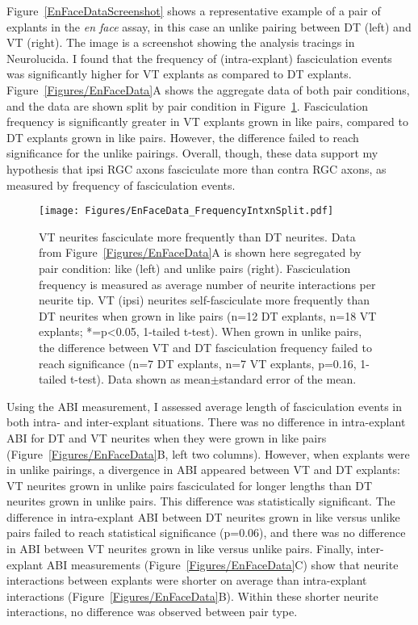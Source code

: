 Figure~\ref{EnFaceDataScreenshot} shows a representative example of a pair of explants in the \emph{en face} assay, in this case an unlike pairing between DT (left) and VT (right).
The image is a screenshot showing the analysis tracings in Neurolucida.
I found that the frequency of (intra-explant) fasciculation events was significantly higher for VT explants as compared to DT explants.
Figure~\ref{Figures/EnFaceData}A shows the aggregate data of both pair conditions, and the data are shown split by pair condition in Figure~\ref{Figures/EnFaceDataFrequencyIntxnSplit}.
Fasciculation frequency is significantly greater in VT explants grown in like pairs, compared to DT explants grown in like pairs.
However, the difference failed to reach significance for the unlike pairings.
Overall, though, these data support my hypothesis that ipsi RGC axons fasciculate more than contra RGC axons, as measured by frequency of fasciculation events.
\begin{figure}[hbtp]
    \begin{center}
        \texttt{[image: Figures/EnFaceData\_FrequencyIntxnSplit.pdf]}
        \caption[VT neurites fasciculate more frequently than DT neurites.]
        {
        VT neurites fasciculate more frequently than DT neurites.
        Data from Figure~\ref{Figures/EnFaceData}A is shown here segregated by pair condition: like (left) and unlike pairs (right).
        Fasciculation frequency is measured as average number of neurite interactions per neurite tip.
        VT (ipsi) neurites self-fasciculate more frequently than DT neurites when grown in like pairs (n=12 DT explants, n=18 VT explants; *=p<0.05, 1-tailed t-test).
        When grown in unlike pairs, the difference between VT and DT fasciculation frequency failed to reach significance (n=7 DT explants, n=7 VT explants, p=0.16, 1-tailed t-test).
        Data shown as mean$\pm$standard error of the mean.
        }
        \label{Figures/EnFaceDataFrequencyIntxnSplit}
    \end{center}
\end{figure}

Using the ABI measurement, I assessed average length of fasciculation events in both intra- and inter-explant situations.
There was no difference in intra-explant ABI for DT and VT neurites when they were grown in like pairs (Figure~\ref{Figures/EnFaceData}B, left two columns).
However, when explants were in unlike pairings, a divergence in ABI appeared between VT and DT explants: VT neurites grown in unlike pairs fasciculated for longer lengths than DT neurites grown in unlike pairs.
This difference was statistically significant.
The difference in intra-explant ABI between DT neurites grown in like versus unlike pairs failed to reach statistical significance (p=0.06), and there was no difference in ABI between VT neurites grown in like versus unlike pairs.
Finally, inter-explant ABI measurements (Figure~\ref{Figures/EnFaceData}C) show that neurite interactions between explants were shorter on average than intra-explant interactions (Figure~\ref{Figures/EnFaceData}B).
Within these shorter neurite interactions, no difference was observed between pair type.

